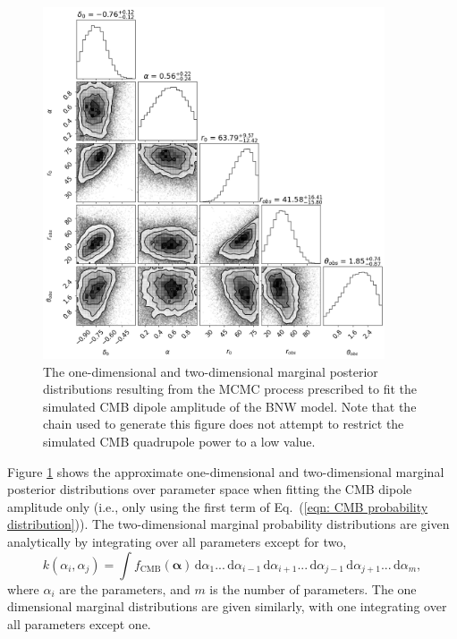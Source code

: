 \documentclass[a4paper,12pt]{report}
\newcommand{\diff}[1]{\,\text{d}{#1}}
\renewcommand{\vec}[1]{\ensuremath{\bm{#1}}}
\renewcommand{\eqref}[1]{Eq.~({#1})}
\begin{document}
\begin{figure}
    \centering
    \includegraphics[width=0.9\textwidth]{BNW Model MCMC/cmb only mcmc_no_quad_restriction.png}
    \caption{The one-dimensional and two-dimensional marginal posterior distributions resulting from the MCMC process prescribed to fit the simulated CMB dipole amplitude of the BNW model. Note that the chain used to generate this figure does not attempt to restrict the simulated CMB quadrupole power to a low value.}
    \label{fig: BNW CMB dipole only MCMC corner}
\end{figure}

Figure \ref{fig: BNW CMB dipole only MCMC corner} shows the approximate one-dimensional and two-dimensional marginal posterior distributions over parameter space when fitting the CMB dipole amplitude only (i.e., only using the first term of \eqref{\ref{eqn: CMB probability distribution}}). The two-dimensional marginal probability distributions are given analytically by integrating over all parameters except for two,
\begin{equation}
    k(\alpha_i, \alpha_j) = \int f_{\text{CMB}}(\vec{\alpha}) \diff{\alpha_1} ... \diff{\alpha_{i-1}} \diff{\alpha_{i+1}} ... \diff{\alpha_{j-1}}\diff{\alpha_{j+1}} ... \diff{\alpha_m},
\end{equation}
where $\alpha_i$ are the parameters, and $m$ is the number of parameters. The one dimensional marginal distributions are given similarly, with one integrating over all parameters except one.
\end{document}
